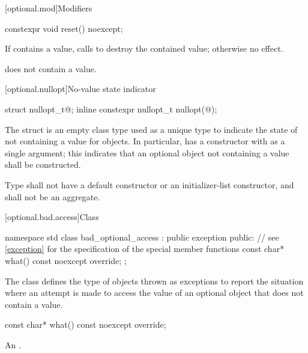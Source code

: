 [optional.mod]{Modifiers}

%
\begin{itemdecl}
constexpr void reset() noexcept;
\end{itemdecl}

\begin{itemdescr}
\pnum
\effects
If  contains a value, calls  to destroy the contained value;
otherwise no effect.

\pnum
\ensures
{} does not contain a value.
\end{itemdescr}

[optional.nullopt]{No-value state indicator}

%
%
\begin{itemdecl}
struct nullopt_t{@\seebelow@};
inline constexpr nullopt_t nullopt(@\unspec@);
\end{itemdecl}

\pnum
The struct  is an empty class type used as a unique type to indicate the state of not containing a value for  objects.
In particular,  has a constructor with  as a single argument;
this indicates that an optional object not containing a value shall be constructed.

\pnum
Type  shall not have a default constructor or an initializer-list constructor, and shall not be an aggregate.

[optional.bad.access]{Class }

\begin{codeblock}
namespace std {
  class bad_optional_access : public exception {
  public:
    // see \ref{exception} for the specification of the special member functions
    const char* what() const noexcept override;
  };
}
\end{codeblock}

\pnum
The class  defines the type of objects thrown as exceptions to report the situation where an attempt is made to access the value of an optional object that does not contain a value.

%
\begin{itemdecl}
const char* what() const noexcept override;
\end{itemdecl}

\begin{itemdescr}
\pnum
\returns
An  \ntbs{}.
\end{itemdescr}

